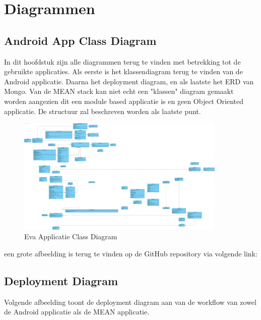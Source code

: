\chapter{Diagrammen}
\label{ch:Diagrammen}

\section{Android App Class Diagram}

In dit hoofdstuk zijn alle diagrammen terug te vinden met betrekking tot de gebruikte applicaties. Als eerste is het klassendiagram terug te vinden van de Android applicatie. Daarna het deployment diagram, en als laatste het ERD van Mongo. Van de MEAN stack kan niet echt een "klassen" diagram gemaakt worden aangezien dit een module based applicatie is en geen Object Oriented applicatie. De structuur zal beschreven worden als laatste punt.

\begin{figure}[H]
	\centering
	\includegraphics[width=10cm]{img/EvaAndroid.jpg}
	\caption{Eva Applicatie Class Diagram}
\end{figure}

een grote afbeelding is terug te vinden op de GitHub repository via volgende link: 

\section{Deployment Diagram}

Volgende afbeelding toont de deployment diagram aan van de workflow van zowel de Android applicatie als de MEAN applicatie.


